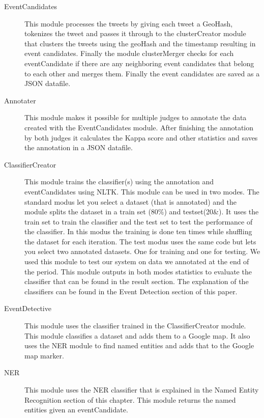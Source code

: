 \documentclass[
10pt, %
a4paper, %
oneside, %
headinclude,footinclude, %
BCOR5mm, %
]{scrartcl}
\begin{document}
\begin{description}

\item[EventCandidates] 
This module processes the tweets by giving each tweet a GeoHash, tokenizes the tweet and passes it through to the clusterCreator module that clusters the tweets using the geoHash and the timestamp resulting in event candidates. Finally the module clusterMerger checks for each eventCandidate if there are any neighboring event candidates that belong to each other and merges them. Finally the event candidates are saved as a JSON datafile.


\item[Annotater] 
This module makes it possible for multiple judges to annotate the data created with the EventCandidates module. After finishing the annotation by both judges it calculates the Kappa score and other statistics and saves the annotation in a JSON datafile.

\item[ClassifierCreator] 
This module trains the classifier(s) using the annotation and eventCandidates using NLTK. This module can be used in two modes. The standard modus let you select a dataset (that is annotated)  and the module splits the dataset in a train set (80\%) and testset(20\&). It uses the train set to train the classifier and the test set to test the performance of the classifier. In this modus the training is done ten times while shuffling the dataset for each iteration.
The test modus uses the same code but lets you select two annotated datasets. One for training and one for testing. We used this module to test our system on data we annotated at the end of the period. This module outputs in both modes statistics to evaluate the classifier that can be found in the result section. The explanation of the classifiers can be found in the Event Detection section of this paper.

\item[EventDetective] 
This module uses the classifier trained in the ClassifierCreator module. This module classifies a dataset and adds them to a Google map. It also uses the NER module to find named entities and adds that to the Google map marker.

\item[NER]
This module uses the NER classifier that is explained in the Named Entity Recognition section of this chapter.  This module returns the named entities given an eventCandidate.

\end{description}
\end{document}
